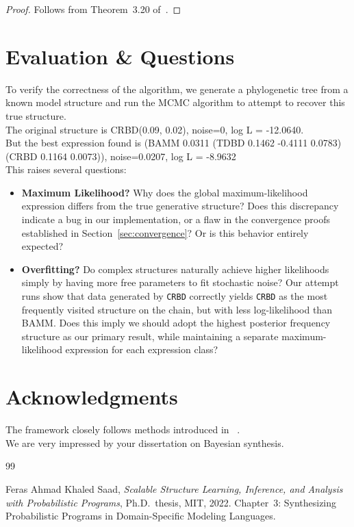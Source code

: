 \documentclass[11pt,a4paper]{article}
\begin{document}
\begin{proof}
Follows from Theorem~3.20 of~\cite{saad2023}.
\end{proof}

\section{Evaluation \& Questions}\label{sec:evaluation}

To verify the correctness of the algorithm, we generate a phylogenetic tree from a known model structure and run the MCMC algorithm to attempt to recover this true structure.\\
The original structure is CRBD(0.09, 0.02), noise=0, log L = -12.0640.\\
But the best expression found is (BAMM 0.0311 (TDBD 0.1462 -0.4111 0.0783) (CRBD 0.1164 0.0073)), noise=0.0207, log L = -8.9632\\
This raises several questions:

\begin{itemize}
\item \textbf{Maximum Likelihood?} Why does the global maximum-likelihood expression differs from the true generative structure? Does this discrepancy indicate a bug in our implementation, or a flaw in the convergence proofs established in Section~\ref{sec:convergence}? Or is this behavior entirely expected?

\item \textbf{Overfitting?} Do complex structures naturally achieve higher likelihoods simply by having more free parameters to fit stochastic noise?
Our attempt runs show that data generated by \texttt{CRBD} correctly yields \texttt{CRBD} as the most frequently visited structure on the chain, but with less log-likelihood than BAMM. Does this imply we should adopt the highest posterior frequency structure as our primary result, while maintaining a separate maximum-likelihood expression for each expression class?
\end{itemize}
\section*{Acknowledgments}
The framework closely follows methods introduced in ~\cite{saad2023}.\\
We are very impressed by your dissertation on Bayesian synthesis.

\begin{thebibliography}{99}

Feras Ahmad Khaled Saad,
\emph{Scalable Structure Learning, Inference, and Analysis with Probabilistic Programs},
Ph.D.\ thesis, MIT, 2022.
Chapter~3: Synthesizing Probabilistic Programs in Domain-Specific
Modeling Languages.

\end{thebibliography}
\end{document}
